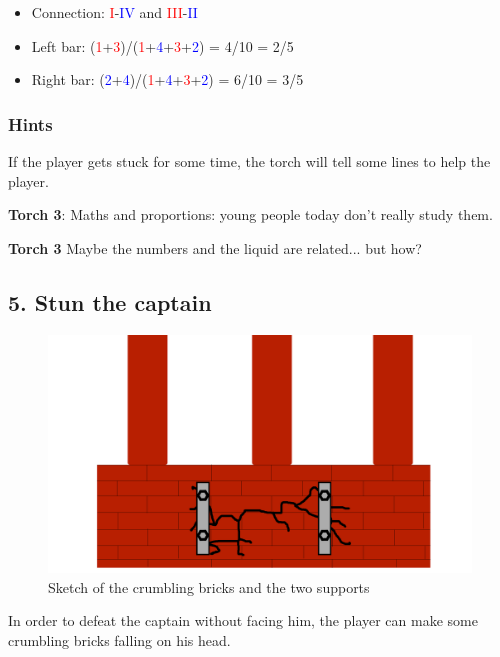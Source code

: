\begin{itemize}
	\item Connection: \textcolor{red}{I}-\textcolor{blue}{IV} and \textcolor{red}{III}-\textcolor{blue}{II}
	\item Left bar: (\textcolor{red}{1}+\textcolor{red}{3})/(\textcolor{red}{1}+\textcolor{blue}{4}+\textcolor{red}{3}+\textcolor{blue}{2}) = 4/10 = 2/5
	\item Right bar: (\textcolor{blue}{2}+\textcolor{blue}{4})/(\textcolor{red}{1}+\textcolor{blue}{4}+\textcolor{red}{3}+\textcolor{blue}{2}) = 6/10 = 3/5
\end{itemize}

\subsubsection*{Hints}
If the player gets stuck for some time, the torch will tell some lines to help the player.

\textbf{Torch 3}: Maths and proportions: young people today don't really study them.

\textbf{Torch 3} Maybe the numbers and the liquid are related... but how? 


\subsection{5. Stun the captain}

\begin{figure}[H]
  \centering
  \includegraphics[width=\textwidth]{Images/Puzzles/castleOfDynamia5}
  \caption{Sketch of the crumbling bricks and the two supports}
\end{figure}

In order to defeat the captain without facing him, the player can make some crumbling bricks falling on his head.

